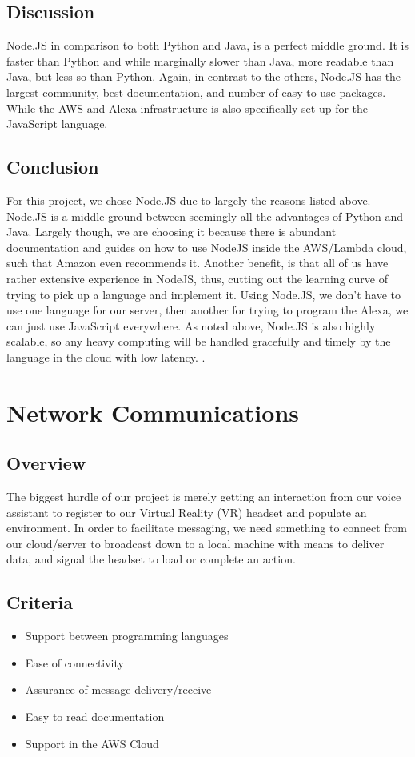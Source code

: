 \documentclass[onecolumn, draftclsnofoot,10pt, compsoc]{IEEEtran}
\begin{document}
    \subsection{Discussion}
       Node.JS in comparison to both Python and Java, is a perfect middle ground. It is faster than Python and while marginally slower than Java, more readable than Java, but less so than Python. Again, in contrast to the others, Node.JS has the largest community, best documentation, and number of easy to use packages. While the AWS and Alexa infrastructure is also specifically set up for the JavaScript language. 
       
    \subsection{Conclusion}
       For this project, we chose Node.JS due to largely the reasons listed above. Node.JS is a middle ground between seemingly all the advantages of Python and Java. Largely though, we are choosing it because there is abundant documentation and guides on how to use NodeJS inside the AWS/Lambda cloud, such that Amazon even recommends it. Another benefit, is that all of us have rather extensive experience in NodeJS, thus, cutting out the learning curve of trying to pick up a language and implement it. Using Node.JS, we don’t have to use one language for our server, then another for trying to program the Alexa, we can just use JavaScript everywhere. As noted above, Node.JS is also highly scalable, so any heavy computing will be handled gracefully and timely by the language in the cloud with low latency. . 
        
        
\section{Network Communications}
    
    \subsection{Overview}
       The biggest hurdle of our project is merely getting an interaction from our voice assistant to register to our Virtual Reality (VR) headset and populate an environment. In order to facilitate messaging, we need something to connect from our cloud/server to broadcast down to a local machine with means to deliver data, and signal the headset to load or complete an action.
    \subsection{Criteria}
        \begin{itemize}
            \item Support between programming languages
            \item Ease of connectivity
            \item Assurance of message delivery/receive
            \item Easy to read documentation
            \item Support in the AWS Cloud
        \end{itemize}
\end{document}
